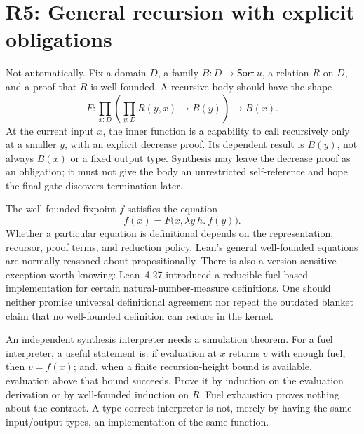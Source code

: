 \section{R5: General recursion with explicit obligations}\label{sec:recursion}


\answer Not automatically. Fix a domain $D$, a family $B:D\to\mathsf{Sort}\ u$, a relation $R$ on $D$, and a proof that $R$ is well founded. A recursive body should have the shape
\begin{equation}\label{eq:capability}
 F:\prod_{x:D}\left(\prod_{y:D}R(y,x)\to B(y)\right)\to B(x).
\end{equation}
At the current input $x$, the inner function is a capability to call recursively only at a smaller $y$, with an explicit decrease proof. Its dependent result is $B(y)$, not always $B(x)$ or a fixed output type. Synthesis may leave the decrease proof as an obligation; it must not give the body an unrestricted self-reference and hope the final gate discovers termination later.

The well-founded fixpoint $f$ satisfies the equation
\[
 f(x)=F\bigl(x,\lambda y\ h.\ f(y)\bigr).
\]
Whether a particular equation is definitional depends on the representation, recursor, proof terms, and reduction policy. Lean's general well-founded equations are normally reasoned about propositionally. There is also a version-sensitive exception worth knowing: Lean~4.27 introduced a reducible fuel-based implementation for certain natural-number-measure definitions. One should neither promise universal definitional agreement nor repeat the outdated blanket claim that no well-founded definition can reduce in the kernel.\cite{leanrecursion,lean427}

An independent synthesis interpreter needs a simulation theorem. For a fuel interpreter, a useful statement is: if evaluation at $x$ returns $v$ with enough fuel, then $v=f(x)$; and, when a finite recursion-height bound is available, evaluation above that bound succeeds. Prove it by induction on the evaluation derivation or by well-founded induction on $R$. Fuel exhaustion proves nothing about the contract. A type-correct interpreter is not, merely by having the same input/output types, an implementation of the same function.

